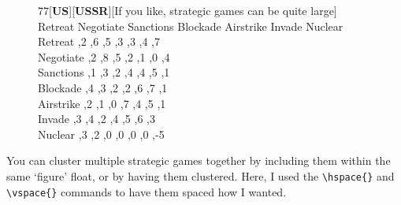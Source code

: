 \documentclass{article}
\begin{document}
\begin{figure}[h]
\begin{center}
\begin{scriptsize}
\begin{game}{7}{7}[\textbf{US}][\textbf{USSR}][If you like, strategic games can be quite large]
          \> Retreat  \>  Negotiate  \> Sanctions    \> Blockade   \> Airstrike  \> Invade  \> Nuclear\\
Retreat   ,2      ,6        ,5          ,3        ,3        ,4     ,7  \\
Negotiate ,2      ,8        ,5          ,2        ,1        ,0     ,4  \\
Sanctions ,1      ,3        ,2          ,4        ,4        ,5     ,1  \\
Blockade  ,4      ,3        ,2          ,2        ,6        ,7     ,1  \\
Airstrike ,2      ,1        ,0          ,7        ,4        ,5     ,1  \\
Invade    ,3      ,4        ,2          ,4        ,5        ,6     ,3  \\
Nuclear   ,3      ,2        ,0          ,0        ,0        ,0     ,-5 \\
\end{game}
\end{scriptsize}
\end{center}
\end{figure}

\clearpage

You can cluster multiple strategic games together by including them within the same `figure' float, or by having them clustered.  Here, I used the \verb+\hspace{}+ and \verb+\vspace{}+ commands to have them spaced how I wanted.
\end{document}

